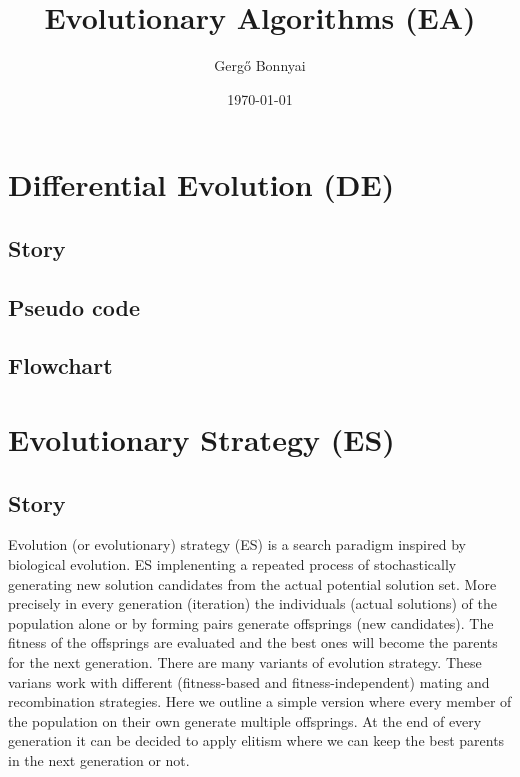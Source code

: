 \documentclass[border=0.2cm]{report}
\title{Evolutionary Algorithms (EA)}
\author{Gergő Bonnyai}
\date{\today}
\begin{document}
\maketitle

\tableofcontents
\listoffigures

\clearpage

\chapter{Differential Evolution (DE)}
\section{Story}
\section{Pseudo code}
\section{Flowchart}

\chapter{Evolutionary Strategy (ES)}
\section{Story}

Evolution (or evolutionary) strategy (ES) \cite{es1, es2} is a search paradigm inspired by biological evolution. ES implenenting a repeated process of stochastically generating new solution candidates from the actual potential solution set. More precisely in every generation (iteration) the individuals (actual solutions) of the population alone or by forming pairs generate offsprings (new candidates). The fitness of the offsprings are evaluated and the best ones will become the parents for the next generation. There are many variants of evolution strategy. These varians work with different (fitness-based and fitness-independent) mating and recombination strategies. Here we outline a simple version where every member of the population on their own generate multiple offsprings. At the end of every generation it can be decided to apply elitism where we can keep the best parents in the next generation or not. \\
\end{document}
